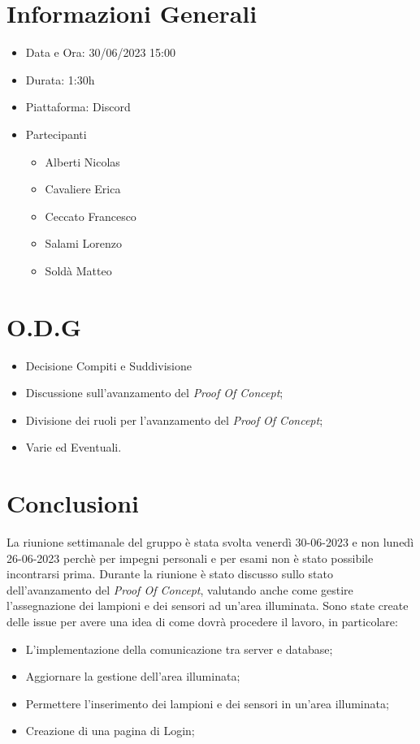 \documentclass[a4paper, 12pt]{article}
\begin{document}
\makefrontpage

\section*{Informazioni Generali}
\begin{itemize}
    \item Data e Ora: 30/06/2023 15:00
    \item Durata: 1:30h
    \item Piattaforma: Discord
    \item Partecipanti
    \begin{itemize}
        \item Alberti Nicolas
        \item Cavaliere Erica
        \item Ceccato Francesco
        \item Salami Lorenzo
        \item Soldà Matteo
    \end{itemize}
\end{itemize}

\section*{O.D.G}
\begin{itemize}
    \item Decisione Compiti e Suddivisione
    \item Discussione sull'avanzamento del \textit{Proof Of Concept};
    \item Divisione dei ruoli per l'avanzamento del \textit{Proof Of Concept};
    \item Varie ed Eventuali.
\end{itemize}

\section*{Conclusioni}
La riunione settimanale del gruppo è stata svolta venerdì 30-06-2023 e non lunedì 26-06-2023 perchè per impegni personali e per esami non è stato possibile incontrarsi prima.
Durante la riunione è stato discusso sullo stato dell'avanzamento del \textit{Proof Of Concept}, valutando anche come gestire l'assegnazione dei lampioni e dei sensori ad un'area illuminata. \newline
Sono state create delle issue per avere una idea di come dovrà procedere il lavoro, in particolare:
\begin{itemize}
    \item L'implementazione della comunicazione tra server e database;
    \item Aggiornare la gestione dell'area illuminata;
    \item Permettere l'inserimento dei lampioni e dei sensori in un'area illuminata;
    \item Creazione di una pagina di Login;
\end{itemize}
\end{document}
